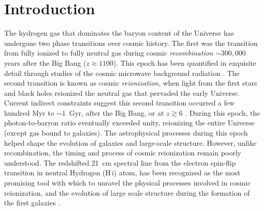 \documentclass[
reprint,
superscriptaddress,
amsmath,
amssymb,
aps,
prd
]{revtex4-1}
\newcommand{\HI}{H\,{\sc i}}
\begin{document}
\pacs{}%


\maketitle


\section{Introduction}\label{sec:intro}

The hydrogen gas that dominates the baryon content of the Universe has undergone two phase transitions over cosmic history. The first was the transition from fully ionized to fully neutral gas during cosmic \emph{recombination\/} $\sim 300,000$ years after the Big Bang ($z\approx 1100$). This epoch has been quantified in exquisite detail through studies of the cosmic microwave background radiation \cite{planck15i}. The second transition is known as cosmic \emph{reionization}, when light from the first stars and black holes reionized the neutral gas that pervaded the early Universe. Current indirect constraints suggest this second transition occurred a few hundred Myr to $\sim 1$~Gyr, after the Big Bang, or at $z\gtrsim 6$ \cite{gre17a}. During this epoch, the photon-to-baryon ratio eventually exceeded unity, reionizing the entire Universe (except gas bound to galaxies). The astrophysical processes during this epoch helped shape the evolution of galaxies and large-scale structure. However, unlike recombination, the timing and process of cosmic reionization remain poorly understood.  The redshifted 21~cm spectral line from the electron spin-flip transition in neutral Hydrogen (\HI) atom, has been recognized as the most promising tool with which to unravel the physical processes involved in cosmic reionization, and the evolution of large scale structure during the formation of the first galaxies \cite{sun72,sco90,mad97,toz00,ili02,fan02,fan06,bar07,mor10}.
\end{document}
